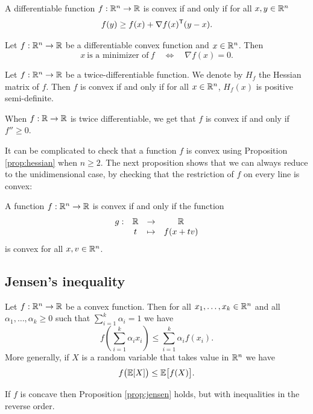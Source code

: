 \documentclass[11pt,nocut]{article}
\begin{document}
\begin{proposition}
	A differentiable function $f: \mathbb{R}^n \to \mathbb{R}$ is convex if and only if for all $x,y \in \mathbb{R}^n$
	$$
	f(y) \geq f(x) + \nabla f(x)^{{\sf T}} (y-x).
	$$
\end{proposition}

\begin{corollary}
	Let $f: \mathbb{R}^n \to \mathbb{R}$ be a differentiable convex function and $x \in \mathbb{R}^n$. Then
	$$
	x \ \text{is a minimizer of} \ f
	\quad \Longleftrightarrow \quad \nabla f(x) = 0.
	$$
\end{corollary}

\begin{proposition}\label{prop:hessian}
	Let $f: \mathbb{R}^n \to \mathbb{R}$ be a twice-differentiable function. We denote by $H_f$ the Hessian matrix of $f$.
	Then $f$ is convex if and only if for all $x \in \mathbb{R}^n$, $H_f(x)$ is positive semi-definite.
\end{proposition}
When $f: \mathbb{R} \to \mathbb{R}$ is twice differentiable, we get that $f$ is convex if and only if $f'' \geq 0$.

It can be complicated to check that a function $f$ is convex using Proposition \ref{prop:hessian} when $n \geq 2$. The next proposition shows that we can always reduce to the unidimensional case, by checking that the restriction of $f$ on every line is convex:

\begin{proposition}
	A function $f: \mathbb{R}^n \to \mathbb{R}$ is convex if and only if the function
	$$
	\begin{array}{rccc}
		g: & \mathbb{R} & \to & \mathbb{R} \\
		   & t & \mapsto & f(x+t v)
	\end{array}
	$$
	is convex for all $x,v \in \mathbb{R}^n$.
\end{proposition}

\subsection{Jensen's inequality}

\begin{proposition}\label{prop:jensen}
	Let $f: \mathbb{R}^n \to \mathbb{R}$ be a convex function. Then for all $x_1, \dots, x_k \in \mathbb{R}^n$ and all $\alpha_1, \dots, \alpha_k \geq 0$ such that $\sum_{i=1}^k \alpha_i = 1$ we have
	$$
	f\left(\sum_{i=1}^k \alpha_i x_i \right) \leq \sum_{i=1}^k \alpha_i f(x_i).
	$$
	More generally, if $X$ is a random variable that takes value in $\mathbb{R}^n$ we have
	$$
	f\big(\mathbb{E} [X]\big) \leq \mathbb{E} \big[f(X)\big].
	$$
\end{proposition}
\begin{remark}
	If $f$ is concave then Proposition \ref{prop:jensen} holds, but with inequalities in the reverse order.
\end{remark}
\end{document}
